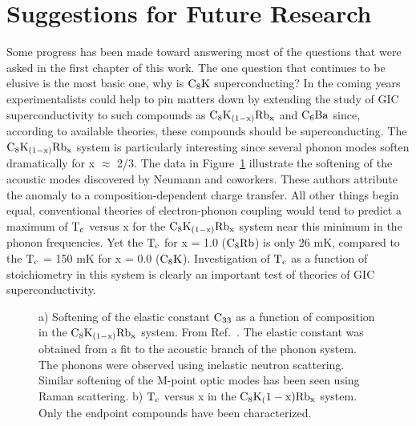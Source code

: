 \section{Suggestions for Future Research}
\label{future}


        Some progress has been made toward answering most of  the questions
that were asked in the first chapter of this  work.  The one  question that
continues  to  be  elusive   is  the most basic  one,   why is $\rm   C_8K$
superconducting?   In the coming  years experimentalists could help  to pin
matters down by  extending   the study  of GIC  superconductivity  to  such
compounds  as $\rm C_8K_{(1-x)}Rb_x$  and $\rm  C_6Ba$ since, according  to
available     theories,\cite{M143,takada82}   these  compounds    should be
superconducting.    The  $\rm   C_8K_{(1-x)}Rb_x$ system  is   particularly
interesting since several phonon modes  soften dramatically for x $\approx$
2/3.\cite{neumann84,solin84a} The data in Figure~\ref{softmode}  illustrate
the  softening   of  the acoustic    modes   discovered  by  Neumann    and
coworkers.\cite{neumann84} These authors   attribute   the anomaly    to  a
composition-dependent   charge transfer.   All  other things   begin equal,
conventional theories of  electron-phonon coupling would  tend to predict a
maximum of $\rm T_c$  versus x  for the $\rm C_8K_{(1-x)}Rb_x$  system near
this minimum  in the phonon frequencies.  Yet  the $\rm  T_c$  for x  = 1.0
($\rm C_8Rb$) is only 26 mK,\cite{kobayashi85}  compared to the $\rm T_c$ =
150 mK for x  = 0.0 ($\rm C_8K$).\cite{koike80}  Investigation of $\rm T_c$
as a function of stoichiometry in this system is clearly  an important test
of theories of GIC superconductivity.

\begin{figure}
\vspace{15cm}
\caption[Soft phonon modes in the $\rm C_8K_{(1-x)}Rb_x$ system.]{a) Softening
of the elastic  constant $\rm C_{33}$ as  a function of  composition in the
$\rm  C_8K_{(1-x)}Rb_x$  system.  From Ref.~\cite{neumann84}.  The  elastic
constant was  obtained from a fit  to  the acoustic  branch  of  the phonon
system.   The phonons  were  observed using   inelastic neutron scattering.
Similar softening of the  M-point optic modes  has  been seen  using  Raman
scattering.\cite{solin84a}  b)   $\rm   T_c$   versus    x   in   the  $\rm
C_8K_(1-x)Rb_x$   system.   Only  the    endpoint compounds      have  been
characterized.}
\label{softmode}
\end{figure}



